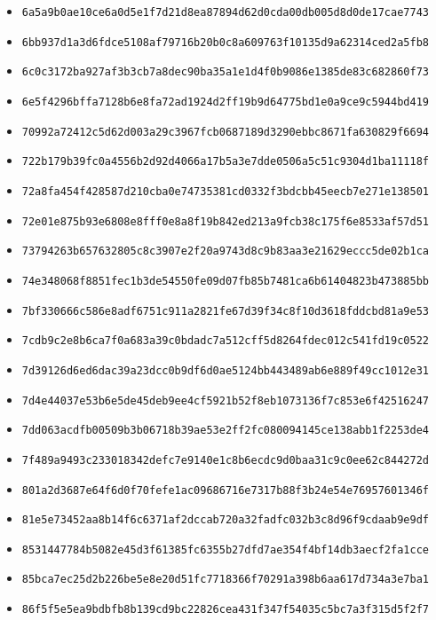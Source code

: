 {\begin{itemize}
    \item \texttt{6a5a9b0ae10ce6a0d5e1f7d21d8ea87894d62d0cda00db005d8d0de17cae7743}
    \item \texttt{6bb937d1a3d6fdce5108af79716b20b0c8a609763f10135d9a62314ced2a5fb8}
    \item \texttt{6c0c3172ba927af3b3cb7a8dec90ba35a1e1d4f0b9086e1385de83c682860f73}
    \item \texttt{6e5f4296bffa7128b6e8fa72ad1924d2ff19b9d64775bd1e0a9ce9c5944bd419}
    \item \texttt{70992a72412c5d62d003a29c3967fcb0687189d3290ebbc8671fa630829f6694}
    \item \texttt{722b179b39fc0a4556b2d92d4066a17b5a3e7dde0506a5c51c9304d1ba11118f}
    \item \texttt{72a8fa454f428587d210cba0e74735381cd0332f3bdcbb45eecb7e271e138501}
    \item \texttt{72e01e875b93e6808e8fff0e8a8f19b842ed213a9fcb38c175f6e8533af57d51}
    \item \texttt{73794263b657632805c8c3907e2f20a9743d8c9b83aa3e21629eccc5de02b1ca}
    \item \texttt{74e348068f8851fec1b3de54550fe09d07fb85b7481ca6b61404823b473885bb}
    \item \texttt{7bf330666c586e8adf6751c911a2821fe67d39f34c8f10d3618fddcbd81a9e53}
    \item \texttt{7cdb9c2e8b6ca7f0a683a39c0bdadc7a512cff5d8264fdec012c541fd19c0522}
    \item \texttt{7d39126d6ed6dac39a23dcc0b9df6d0ae5124bb443489ab6e889f49cc1012e31}
    \item \texttt{7d4e44037e53b6e5de45deb9ee4cf5921b52f8eb1073136f7c853e6f42516247}
    \item \texttt{7dd063acdfb00509b3b06718b39ae53e2ff2fc080094145ce138abb1f2253de4}
    \item \texttt{7f489a9493c233018342defc7e9140e1c8b6ecdc9d0baa31c9c0ee62c844272d}
    \item \texttt{801a2d3687e64f6d0f70fefe1ac09686716e7317b88f3b24e54e76957601346f}
    \item \texttt{81e5e73452aa8b14f6c6371af2dccab720a32fadfc032b3c8d96f9cdaab9e9df}
    \item \texttt{8531447784b5082e45d3f61385fc6355b27dfd7ae354f4bf14db3aecf2fa1cce}
    \item \texttt{85bca7ec25d2b226be5e8e20d51fc7718366f70291a398b6aa617d734a3e7ba1}
    \item \texttt{86f5f5e5ea9bdbfb8b139cd9bc22826cea431f347f54035c5bc7a3f315d5f2f7}

\end{itemize}}
